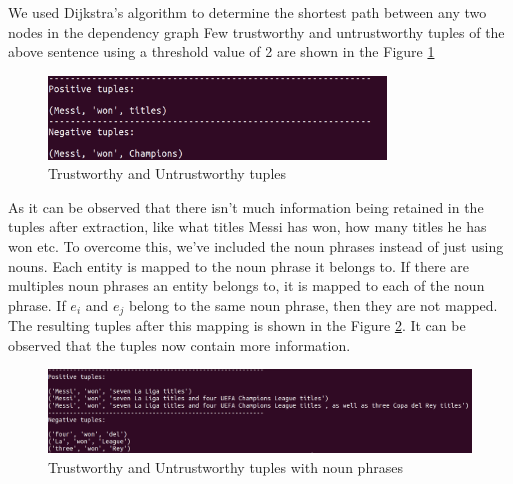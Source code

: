 \documentclass{article}
\begin{document}
We used Dijkstra's algorithm \cite{Dijkstra} to determine the shortest path between any two nodes in the dependency graph
Few trustworthy and untrustworthy tuples of the above sentence using a threshold value of 2 are shown in the Figure \ref{fig:tuples}

\begin{figure}[h]
\centering
\includegraphics[width=0.8\textwidth]{tuples.png}
\caption{Trustworthy and Untrustworthy tuples}
\label{fig:tuples}
\end{figure}

As it can be observed that there isn't much information being retained in the tuples after extraction, like what titles Messi has won, how many titles he has won etc. To overcome this, we've included the noun phrases instead of just using nouns. Each entity is mapped to the noun phrase it belongs to. If there are multiples noun phrases an entity belongs to, it is mapped to each of the noun phrase. If $e_i$ and $e_j$ belong to the same noun phrase, then they are not mapped. The resulting tuples after this mapping is shown in the Figure \ref{fig:tuples_chunk}. It can be observed that the tuples now contain more information.

\begin{figure}[h]
\centering
\includegraphics[width=1.0\textwidth]{tuples-chunk.png}
\caption{Trustworthy and Untrustworthy tuples with noun phrases}
\label{fig:tuples_chunk}
\end{figure}
\end{document}
